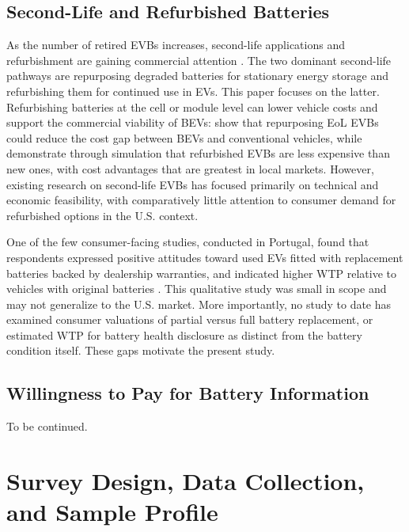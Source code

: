 \documentclass[a4paper,fleqn]{cas-sc}   %
\begin{document}
\subsection{Second-Life and Refurbished Batteries}
As the number of retired EVBs increases, second-life applications and refurbishment are gaining commercial attention \parencite{skeeteEVentHorizonBattery2020, tankouScalingReuseRecycling2023}. The two dominant second-life pathways are repurposing degraded batteries for stationary energy storage and refurbishing them for continued use in EVs. This paper focuses on the latter. Refurbishing batteries at the cell or module level can lower vehicle costs and support the commercial viability of BEVs: \textcite{jiaoBusinessModelsSustainability2016} show that repurposing EoL EVBs could reduce the cost gap between BEVs and conventional vehicles, while \textcite{shaikhSystemDynamicsCosting2023} demonstrate through simulation that refurbished EVBs are less expensive than new ones, with cost advantages that are greatest in local markets. However, existing research on second-life EVBs has focused primarily on technical and economic feasibility, with comparatively little attention to consumer demand for refurbished options in the U.S. context.

One of the few consumer-facing studies, conducted in Portugal, found that respondents expressed positive attitudes toward used EVs fitted with replacement batteries backed by dealership warranties, and indicated higher WTP relative to vehicles with original batteries \parencite{pedrosaSecondhandElectricalVehicles2018}. This qualitative study was small in scope and may not generalize to the U.S. market. More importantly, no study to date has examined consumer valuations of partial versus full battery replacement, or estimated WTP for battery health disclosure as distinct from the battery condition itself. These gaps motivate the present study.

\subsection{Willingness to Pay for Battery Information}
\par

To be continued.




\section{Survey Design, Data Collection, and Sample Profile}
\label{section:data}
\end{document}
